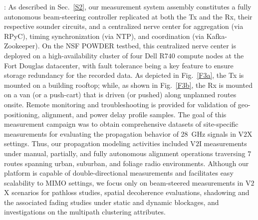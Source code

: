\documentclass[10pt, twocolumn]{IEEEtran}
\begin{document}
: As described in Sec.~\ref{S2}, our measurement system assembly constitutes a fully autonomous beam-steering controller replicated at both the Tx and the Rx, their respective sounder circuits, and a centralized nerve center for aggregation (via RPyC), timing synchronization (via NTP), and coordination (via Kafka-Zookeeper). On the NSF POWDER testbed, this centralized nerve center is deployed on a high-availability cluster of four Dell R$740$ compute nodes at the Fort Douglas datacenter, with fault tolerance being a key feature to ensure storage redundancy for the recorded data. As depicted in Fig.~\ref{F3a}, the Tx is mounted on a building rooftop; while, as shown in Fig.~\ref{F3b}, the Rx is mounted on a van (or a push-cart) that is driven (or pushed) along unplanned routes onsite. Remote monitoring and troubleshooting is provided for validation of geo-positioning, alignment, and power delay profile samples. The goal of this measurement campaign was to obtain comprehensive datasets of site-specific measurements for evaluating the propagation behavior of \SI{28}{\giga\hertz} signals in V$2$X settings. Thus, our propagation modeling activities included V$2$I measurements under manual, partially, and fully autonomous alignment operations traversing $7$ routes spanning urban, suburban, and foliage radio environments. Although our platform is capable of double-directional measurements and facilitates easy scalability to MIMO settings, we focus only on beam-steered measurements in V$2$X scenarios for pathloss studies, spatial decoherence evaluations, shadowing and the associated fading studies under static and dynamic blockages, and investigations on the multipath clustering attributes.
\end{document}
